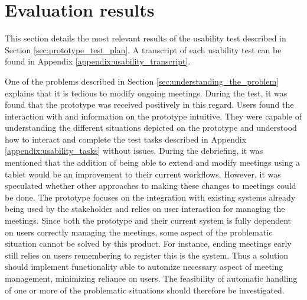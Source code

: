 \section{Evaluation results}\label{sec:usability_evaluation_results}
This section details the most relevant results of the usability test described in Section \ref{sec:prototype_test_plan}.
A transcript of each usability test can be found in Appendix \ref{appendix:usability_transcript}.

One of the problems described in Section \ref{sec:understanding_the_problem} explains that it is tedious to modify ongoing meetings. 
During the test, it was found that the prototype was received positively in this regard. 
Users found the interaction with and information on the prototype intuitive. 
They were capable of understanding the different situations depicted on the prototype and understood how to interact and complete the test tasks described in Appendix \ref{appendix:usability_tasks} without issues.
During the debriefing, it was mentioned that the addition of being able to extend and modify meetings using a tablet would be an improvement to their current workflows.
However, it was speculated whether other approaches to making these changes to meetings could be done. 
The prototype focuses on the integration with existing systems already being used by the stakeholder and relies on user interaction for managing the meetings.
Since both the prototype and their current system is fully dependent on users correctly managing the meetings, some aspect of the problematic situation cannot be solved by this product. 
For instance, ending meetings early still relies on users remembering to register this is the system. 
Thus a solution should implement functionality able to automize necessary aspect of meeting management, minimizing reliance on users.
The feasibility of  automatic handling of one or more of the problematic situations should therefore be investigated.